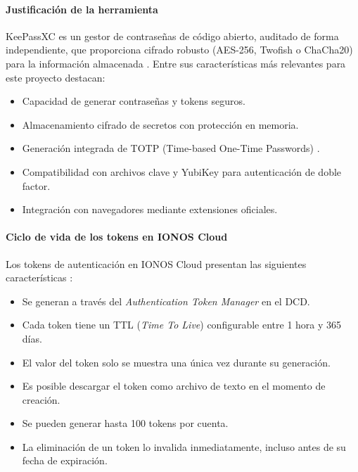 \paragraph{Justificación de la herramienta}
\vspace{0.25cm} 
KeePassXC es un gestor de contraseñas de código abierto, auditado de forma independiente, que proporciona cifrado robusto (AES-256, Twofish o ChaCha20) para la información almacenada \cite{keepassxc-audit}. Entre sus características más relevantes para este proyecto destacan:
\begin{itemize}
    \item Capacidad de generar contraseñas y tokens seguros.
    \item Almacenamiento cifrado de secretos con protección en memoria.
    \item Generación integrada de TOTP (Time-based One-Time Passwords) \cite{keepassxc-features}.
    \item Compatibilidad con archivos clave y YubiKey para autenticación de doble factor.
    \item Integración con navegadores mediante extensiones oficiales.
\end{itemize}

\paragraph{Ciclo de vida de los tokens en IONOS Cloud}
\vspace{0.25cm}
Los tokens de autenticación en IONOS Cloud presentan las siguientes características \cite{ionos-token-management}:
\begin{itemize}
    \item Se generan a través del \textit{Authentication Token Manager} en el DCD.
    \item Cada token tiene un TTL (\textit{Time To Live}) configurable entre 1 hora y 365 días.
    \item El valor del token solo se muestra una única vez durante su generación.
    \item Es posible descargar el token como archivo de texto en el momento de creación.
    \item Se pueden generar hasta 100 tokens por cuenta.
    \item La eliminación de un token lo invalida inmediatamente, incluso antes de su fecha de expiración.
\end{itemize}

